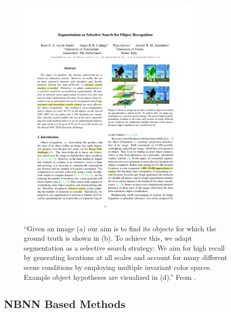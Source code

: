 \begin{figure}[hbt]
    \centering
    \includegraphics[width=0.8\textwidth]{LocByDet}
    \caption{``Given an image (a) our aim is to find its objects for which the ground truth is shown in (b). To achieve this, we adapt segmentation as a selective search strategy: We aim for high recall by generating locations at all scales and account for many different scene conditions by employing multiple invariant color spaces. Example object hypotheses are visualized in (d).'' From \cite{van2011segmentation}.}
    \label{fig:locbydet}
\end{figure}


\subsection{NBNN Based Methods} %
\label{sec:nbnn_based_methods}

